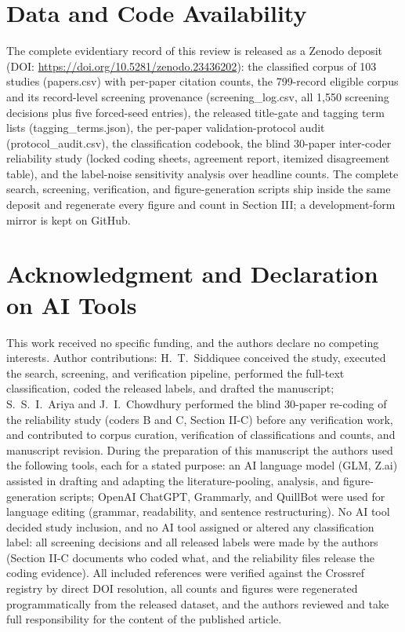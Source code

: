 \documentclass[journal]{IEEEtran}
\begin{document}
\balance

\section*{Data and Code Availability}

The complete evidentiary record of this review is released as a Zenodo deposit (DOI: \url{https://doi.org/10.5281/zenodo.23436202}): the classified corpus of 103 studies (papers.csv) with per-paper citation counts, the 799-record eligible corpus and its record-level screening provenance (screening\_log.csv, all 1{,}550 screening decisions plus five forced-seed entries), the released title-gate and tagging term lists (tagging\_terms.json), the per-paper validation-protocol audit (protocol\_audit.csv), the classification codebook, the blind 30-paper inter-coder reliability study (locked coding sheets, agreement report, itemized disagreement table), and the label-noise sensitivity analysis over headline counts. The complete search, screening, verification, and figure-generation scripts ship inside the same deposit and regenerate every figure and count in Section III; a development-form mirror is kept on GitHub.

\section*{Acknowledgment and Declaration on AI Tools}

This work received no specific funding, and the authors declare no competing interests. Author contributions: H.~T.~Siddiquee conceived the study, executed the search, screening, and verification pipeline, performed the full-text classification, coded the released labels, and drafted the manuscript; S.~S.~I.~Ariya and J.~I.~Chowdhury performed the blind 30-paper re-coding of the reliability study (coders B and C, Section II-C) before any verification work, and contributed to corpus curation, verification of classifications and counts, and manuscript revision. During the preparation of this manuscript the authors used the following tools, each for a stated purpose: an AI language model (GLM, Z.ai) assisted in drafting and adapting the literature-pooling, analysis, and figure-generation scripts; OpenAI ChatGPT, Grammarly, and QuillBot were used for language editing (grammar, readability, and sentence restructuring). No AI tool decided study inclusion, and no AI tool assigned or altered any classification label: all screening decisions and all released labels were made by the authors (Section II-C documents who coded what, and the reliability files release the coding evidence). All included references were verified against the Crossref registry by direct DOI resolution, all counts and figures were regenerated programmatically from the released dataset, and the authors reviewed and take full responsibility for the content of the published article.
\end{document}
